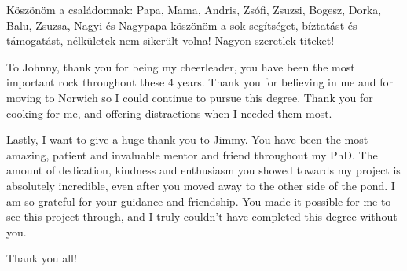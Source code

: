 \begin{acknowledgements}
Köszönöm a családomnak: Papa, Mama, Andris, Zsófi, Zsuzsi, Bogesz, Dorka, Balu, Zsuzsa, Nagyi és Nagypapa köszönöm a sok segítséget, bíztatást és támogatást, nélkületek nem sikerült volna! Nagyon szeretlek titeket!

To Johnny, thank you for being my cheerleader, you have been the most important rock throughout these 4 years. Thank you for believing in me and for moving to Norwich so I could continue to pursue this degree. Thank you for cooking for me, and offering distractions when I needed them most.

Lastly, I want to give a huge thank you to Jimmy. You have been the most amazing, patient and invaluable mentor and friend throughout my PhD. The amount of dedication, kindness and enthusiasm you showed towards my project is absolutely incredible, even after you moved away to the other side of the pond. I am so grateful for your guidance and friendship. You made it possible for me to see this project through, and I truly couldn’t have completed this degree without you.

Thank you all!


\end{acknowledgements}
